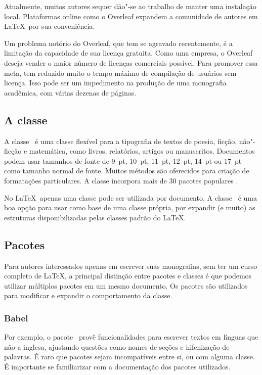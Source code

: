 Atualmente, muitos autores sequer dão"-se ao trabalho de manter uma instalação local. Plataformas online como o Overleaf expandem a comunidade de autores em \LaTeX\ por sua conveniência.

Um problema notório do Overleaf, que tem se agravado recentemente, é a limitação da capacidade de sua licença gratuita. Como uma empresa, o Overleaf deseja vender o maior número de licenças comerciais possível. Para promover essa meta, tem reduzido muito o tempo máximo de compilação de usuários sem licença. Isso pode ser um impedimento na produção de uma monografia acadêmica, com várias dezenas de páginas.

\subsection{A classe \memoir}

A classe \memoir\ é uma classe flexível para a tipografia de textos de poesia, ficção, não"-ficção e matemática, como livros, relatórios, artigos ou manuscritos. Documentos podem usar tamanhos de fonte de 9~pt, 10~pt, 11~pt, 12~pt, 14~pt ou 17~pt como tamanho normal de fonte. Muitos métodos são oferecidos para criação de formatações particulares. A classe incorpora mais de 30 pacotes populares \cite{memoir2001}.

No \LaTeX\, apenas uma classe pode ser utilizada por documento. A classe \memoir\ é uma boa opção para usar como base de uma classe própria, por expandir (e muito) as estruturas disponibilizadas pelas classes padrão do \LaTeX.

\subsection{Pacotes}

Para autores interessados apenas em escrever suas monografias, sem ter um curso completo de \LaTeX, a principal distinção entre pacotes e classes é que podemos utilizar múltiplos pacotes em um mesmo documento. Os pacotes são utilizados para modificar e expandir o comportamento da classe.

\subsubsection{Babel}

Por exemplo, o pacote \babel\ provê funcionalidades para escrever textos em línguas que não a inglesa, ajustando questões como nomes de seções e hifenização de palavras. É raro que pacotes sejam incompatíveis entre si, ou com alguma classe. É importante se familiarizar com a documentação dos pacotes utilizados.


